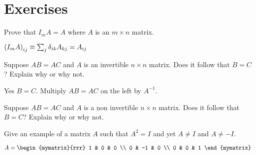 \section*{Exercises}

\begin{enumialphparenastyle}

\begin{ex} Prove that $I_{m}A=A$ where $A$ is an $m\times n$ matrix.
\begin{sol}
 $\left(
I_{m}A\right) _{ij}\equiv \sum_{j}\delta _{ik}A_{kj}=A_{ij}$
\end{sol}
\end{ex}

\begin{ex} Suppose $AB=AC$ and $A$ is an invertible $n\times n$ matrix. Does it
follow that $B=C$? Explain why or why not. 
\begin{sol}
Yes $B=C$. Multiply $AB = AC$ on the left by $A^{-1}$. 
\end{sol}
\end{ex}

\begin{ex} Suppose $AB=AC$ and $A$ is a non invertible $n\times n$ matrix. Does it follow that $B=C$? Explain why or why not.  
\end{ex}

\begin{ex} Give an example of a matrix $A$ such that $A^{2}=I$ and yet $A\neq I$
and $A\neq -I$. 
\begin{sol}
$A = \begin{mymatrix}{rrr}
1 & 0 & 0 \\
0 & -1 & 0 \\
0 & 0 & 1
\end{mymatrix} $
\end{sol}
\end{ex}

\end{enumialphparenastyle}
